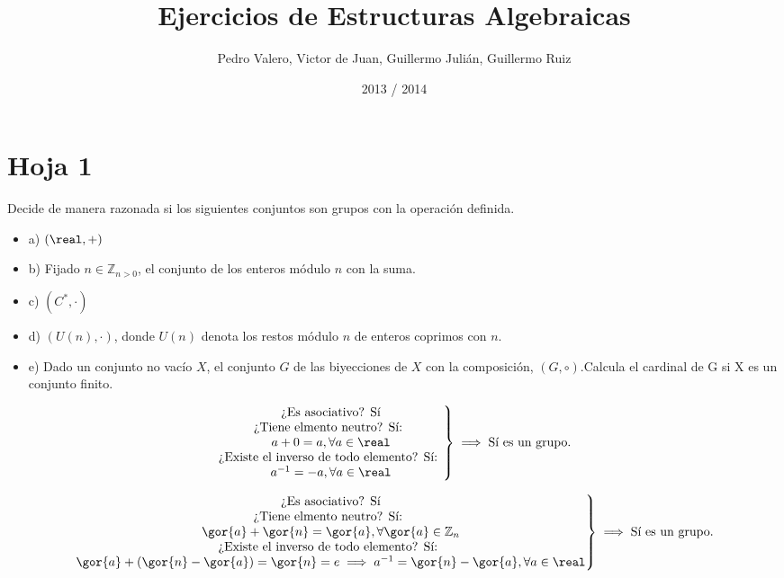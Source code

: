 \documentclass[nochap]{apuntes}
\title{Ejercicios de Estructuras Algebraicas}
\date{2013 / 2014}
\author{Pedro Valero, Victor de Juan, Guillermo Julián, Guillermo Ruiz}
\begin{document}
\maketitle
\newpage
\tableofcontents
\newpage
\section{Hoja 1}
\begin{problem}[1]
 Decide de manera razonada si los siguientes conjuntos son grupos con la operación definida.
 
 \begin{itemize}
  \item a) $(\real,+)$
  \item b) Fijado $n \in \mathbb{Z}_{n>0}$, el conjunto de los enteros módulo $n$ con la suma.
  \item c) $(C^*,\cdot)$
  \item d) $(U (n), ·)$, donde $U (n)$ denota los restos módulo $n$ de enteros coprimos con $n$.
  \item e) Dado un conjunto no vacío $X$, el conjunto $G$ de las biyecciones de $X$ con la composición, $(G, \circ)$.Calcula el cardinal de G si X es un conjunto finito.
 \end{itemize}

 \solution

\spart
$$\left. \begin{matrix}
\text{¿Es asociativo? Sí}\\
\text{¿Tiene elmento neutro? Sí: } \\a + 0 = a, \forall a \in \real\\
\text{¿Existe el inverso de todo elemento? Sí: } \\a^{-1} = -a, \forall a \in \real
\end{matrix}\right\} \implies \text{Sí es un grupo.}$$

\spart
$$\left. \begin{matrix}
\text{¿Es asociativo? Sí}\\
\text{¿Tiene elmento neutro? Sí: } \\\gor{a} + \gor{n} = \gor{a}, \forall \gor{a} \in \mathbb{Z}_n\\
\text{¿Existe el inverso de todo elemento? Sí: } \\ \gor{a} + (\gor{n} - \gor{a}) = \gor{n} = e \implies a^{-1} = \gor{n} - \gor{a}, \forall a \in \real
\end{matrix}\right\} \implies \text{Sí es un grupo.}$$

\end{problem}
\end{document}
